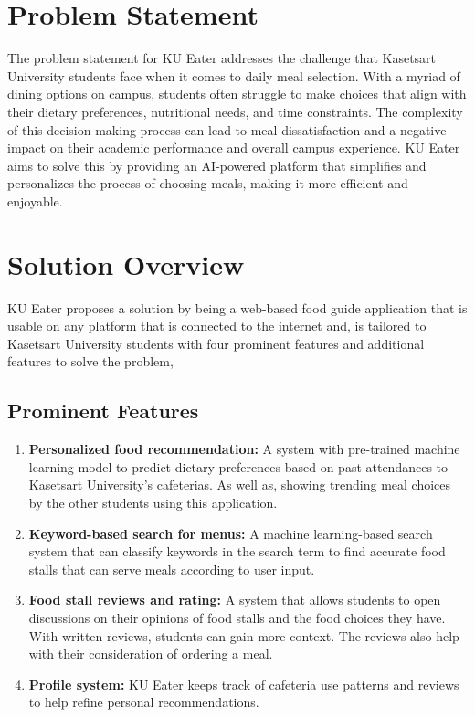 \section{Problem Statement}
\label{section:problem-statement}

The problem statement for KU Eater addresses the challenge that Kasetsart University students face
when it comes to daily meal selection. With a myriad of dining options on campus, students often struggle to make choices
that align with their dietary preferences, nutritional needs, and time constraints. The complexity of this decision-making
process can lead to meal dissatisfaction and a negative impact on their academic performance and overall campus experience.
KU Eater aims to solve this by providing an AI-powered platform that simplifies and personalizes the process of choosing meals,
making it more efficient and enjoyable.

\section{Solution Overview}
\label{section:solution-overview}

KU Eater proposes a solution by being a web-based food guide application that is usable on any platform that is connected to the internet and,
is tailored to Kasetsart University students with four prominent features and additional features to solve the problem,

\subsection{Prominent Features}
\label{subsection:main-features}

\begin{enumerate}[leftmargin=80pt]
    \item \textbf{Personalized food recommendation:} A system with pre-trained machine learning model to predict dietary preferences based on past attendances to Kasetsart University's cafeterias. As well as, showing trending meal choices by the other students using this application.
    \item \textbf{Keyword-based search for menus:} A machine learning-based search system that can classify keywords in the search term to find accurate food stalls that can serve meals according to user input.
    \item \textbf{Food stall reviews and rating:} A system that allows students to open discussions on their opinions of food stalls and the food choices they have. With written reviews, students can gain more context. The reviews also help with their consideration of ordering a meal.
    \item \textbf{Profile system:} KU Eater keeps track of cafeteria use patterns and reviews to help refine personal recommendations.
\end{enumerate}

